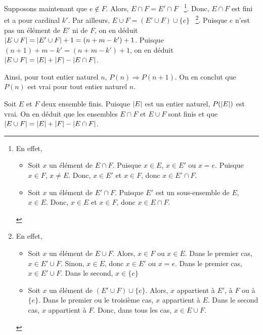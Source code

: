     Supposons maintenant que $e \notin F$. 
    Alors, $E \cap F = E' \cap F$%
    ~\footnote{En effet, 
        \begin{itemize}[nosep]
            \item Soit $x$ un élément de $E \cap F$. 
                Puisque $x \in E$, $x \in E'$ ou $x = e$. 
                Puisque $x \in F$, $x \neq E$. 
                Donc, $x \in E'$ et $x \in F$, donc $x \in E' \cap F$.
            \item Soit $x$ un élément de $E' \cap F$.
                Puisque $E'$ est un sous-ensemble de $E$, $x \in E$.
                Donc, $x \in E$ et $x \in F$, donc $x \in E \cap F$.
        \end{itemize}
    }.
    Donc, $E \cap F$ est fini et a pour cardinal $k'$.
    Par ailleurs, $E \cup F = (E' \cup F) \cup \lbrace e \rbrace$%
    ~\footnote{En effet, 
        \begin{itemize}[nosep]
            \item Soit $x$ un élément de $E \cup F$. 
                Alors, $x \in F$ ou $x \in E$.
                Dans le premier cas, $x \in E' \cup F$.
                Sinon, $x \in E$, donc $x \in E'$ ou $x = e$. 
                Dans le premier cas, $x \in E' \cup F$. 
                Dans le second, $x \in \lbrace e \rbrace$
            \item Soit $x$ un élément de $(E' \cup F) \cup \lbrace e \rbrace$. 
                Alors, $x$ appartient à $E'$, à $F$ ou à $\lbrace e \rbrace$. 
                Dans le premier ou le troisième cas, $x$ appartient à $E$.
                Dans le second cas, $x$ appartient à $F$. 
                Donc, dans tous les cas, $x \in E \cup F$.
        \end{itemize}
    }.
    Puisque $e$ n'est pas un élément de $E'$ ni de $F$, on en déduit $\left\lvert E \cup F \right\rvert = \left\lvert E' \cup F \right\rvert + 1 = (n + m - k') + 1$. 
    Puisque $(n+1) + m - k' = (n + m - k') + 1$, on en déduit $\left\lvert E \cup F \right\rvert = \left\lvert E \right\rvert + \left\lvert F \right\rvert - \left\lvert E \cap F \right\rvert$.

    Ainsi, pour tout entier naturel $n$, $P(n) \Rightarrow P(n+1)$.
    On en conclut que $P(n)$ est vrai pour tout entier naturel $n$. 

    Soit $E$ et $F$ deux ensemble finis. 
    Puisque $\left\lvert E \right\rvert$ est un entier naturel, $P(\left\lvert E \right\rvert)$ est vrai.
    On en déduit que les ensembles $E \cap F$ et $E \cup F$ sont finis et que $\left\lvert E \cup F \right\rvert = \left\lvert E \right\rvert + \left\lvert F \right\rvert - \left\lvert E \cap F \right\rvert$.

    \done

